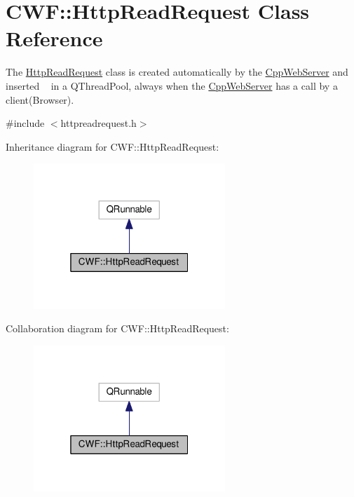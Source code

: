 \hypertarget{class_c_w_f_1_1_http_read_request}{\section{C\+W\+F\+:\+:Http\+Read\+Request Class Reference}
\label{class_c_w_f_1_1_http_read_request}
}


The \hyperlink{class_c_w_f_1_1_http_read_request}{Http\+Read\+Request} class is created automatically by the \hyperlink{class_c_w_f_1_1_cpp_web_server}{Cpp\+Web\+Server} and inserted ~\newline
 in a Q\+Thread\+Pool, always when the \hyperlink{class_c_w_f_1_1_cpp_web_server}{Cpp\+Web\+Server} has a call by a client(\+Browser).  




{\ttfamily \#include $<$httpreadrequest.\+h$>$}



Inheritance diagram for C\+W\+F\+:\+:Http\+Read\+Request\+:
\nopagebreak
\begin{figure}[H]
\begin{center}
\leavevmode
\includegraphics[width=205pt]{class_c_w_f_1_1_http_read_request__inherit__graph}
\end{center}
\end{figure}


Collaboration diagram for C\+W\+F\+:\+:Http\+Read\+Request\+:
\nopagebreak
\begin{figure}[H]
\begin{center}
\leavevmode
\includegraphics[width=205pt]{class_c_w_f_1_1_http_read_request__coll__graph}
\end{center}
\end{figure}
